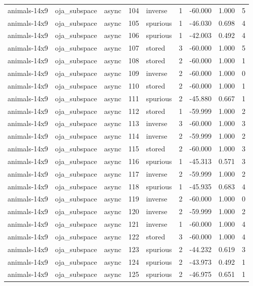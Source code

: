 \begin{tabular}{lllrlrrrr}
animals-14x9 & oja\_subspace & async & 104 & inverse & 1 & -60.000 & 1.000 & 5 \\
animals-14x9 & oja\_subspace & async & 105 & spurious & 1 & -46.030 & 0.698 & 4 \\
animals-14x9 & oja\_subspace & async & 106 & spurious & 1 & -42.003 & 0.492 & 4 \\
animals-14x9 & oja\_subspace & async & 107 & stored & 3 & -60.000 & 1.000 & 5 \\
animals-14x9 & oja\_subspace & async & 108 & stored & 2 & -60.000 & 1.000 & 1 \\
animals-14x9 & oja\_subspace & async & 109 & inverse & 2 & -60.000 & 1.000 & 0 \\
animals-14x9 & oja\_subspace & async & 110 & stored & 2 & -60.000 & 1.000 & 1 \\
animals-14x9 & oja\_subspace & async & 111 & spurious & 2 & -45.880 & 0.667 & 1 \\
animals-14x9 & oja\_subspace & async & 112 & stored & 1 & -59.999 & 1.000 & 2 \\
animals-14x9 & oja\_subspace & async & 113 & inverse & 3 & -60.000 & 1.000 & 3 \\
animals-14x9 & oja\_subspace & async & 114 & inverse & 2 & -59.999 & 1.000 & 2 \\
animals-14x9 & oja\_subspace & async & 115 & stored & 2 & -60.000 & 1.000 & 3 \\
animals-14x9 & oja\_subspace & async & 116 & spurious & 1 & -45.313 & 0.571 & 3 \\
animals-14x9 & oja\_subspace & async & 117 & inverse & 2 & -59.999 & 1.000 & 2 \\
animals-14x9 & oja\_subspace & async & 118 & spurious & 1 & -45.935 & 0.683 & 4 \\
animals-14x9 & oja\_subspace & async & 119 & inverse & 2 & -60.000 & 1.000 & 0 \\
animals-14x9 & oja\_subspace & async & 120 & inverse & 2 & -59.999 & 1.000 & 2 \\
animals-14x9 & oja\_subspace & async & 121 & inverse & 1 & -60.000 & 1.000 & 4 \\
animals-14x9 & oja\_subspace & async & 122 & stored & 3 & -60.000 & 1.000 & 4 \\
animals-14x9 & oja\_subspace & async & 123 & spurious & 2 & -44.232 & 0.619 & 3 \\
animals-14x9 & oja\_subspace & async & 124 & spurious & 2 & -43.973 & 0.492 & 1 \\
animals-14x9 & oja\_subspace & async & 125 & spurious & 2 & -46.975 & 0.651 & 1 \\

\end{tabular}
